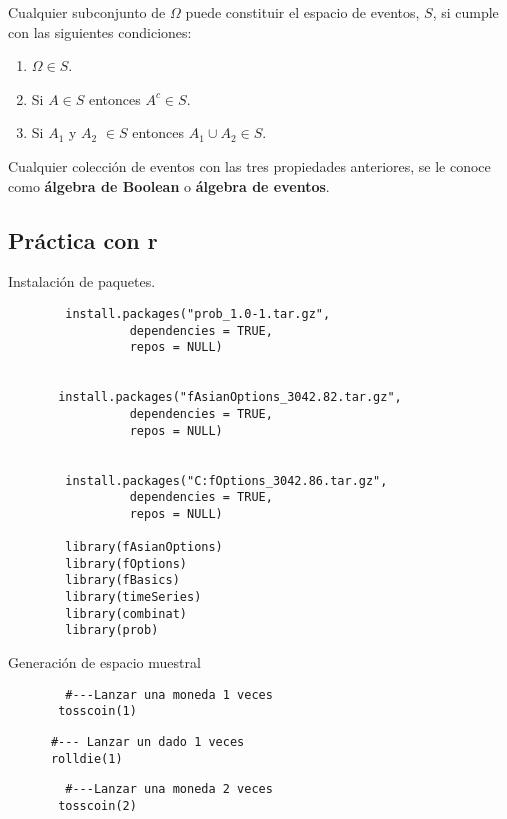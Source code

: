 Cualquier subconjunto de $\Omega$ puede constituir el espacio de eventos, $S$, si cumple con las siguientes condiciones:

\begin{enumerate}
\item $\Omega \in S$.
\item Si $A\in S$ entonces $A^{c}\in S$.
\item Si $A_{1}$ y $A_{2}$ $\in S$ entonces $A_{1}\cup A_{2}\in S$.
\end{enumerate}

Cualquier colección de eventos con las tres propiedades anteriores, se le  conoce como  \textbf{álgebra de Boolean} o  \textbf{álgebra de eventos}.

\subsection{Práctica con r}

Instalación de paquetes.

\begin{lstlisting}
        install.packages("prob_1.0-1.tar.gz",
                 dependencies = TRUE,
                 repos = NULL)


       install.packages("fAsianOptions_3042.82.tar.gz",
                 dependencies = TRUE,
                 repos = NULL)


        install.packages("C:fOptions_3042.86.tar.gz",
                 dependencies = TRUE,
                 repos = NULL)

        library(fAsianOptions)
        library(fOptions)
        library(fBasics)
        library(timeSeries)
        library(combinat)
        library(prob)
\end{lstlisting}


Generación de espacio muestral

\begin{lstlisting}
        #---Lanzar una moneda 1 veces
       tosscoin(1)
\end{lstlisting}


\begin{lstlisting}
      #--- Lanzar un dado 1 veces
      rolldie(1)
\end{lstlisting}

\begin{lstlisting}
        #---Lanzar una moneda 2 veces
       tosscoin(2)
\end{lstlisting}


